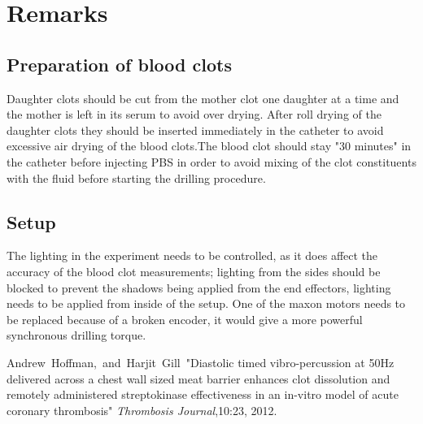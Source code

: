 \documentclass{MNR}
\begin{document}
\section*{Remarks}
\subsection*{Preparation of blood clots}
Daughter clots should be cut from the mother clot one daughter at a time and the mother is left in its serum to avoid over drying. After roll drying of the daughter clots they should be inserted immediately in the catheter to avoid excessive air drying of the blood clots.The blood clot should stay "30 minutes" in the catheter before injecting PBS in order to avoid mixing of the clot constituents with the fluid before starting the drilling procedure. 



\subsection*{Setup}
The lighting in the experiment needs to be controlled, as it does affect the accuracy of the blood clot measurements; lighting from the sides should be blocked to prevent the shadows being applied from the end effectors, lighting needs to be applied from inside of the setup.
One of the maxon motors needs to be replaced because of a broken encoder, it would give a more powerful synchronous drilling torque.



\begin{thebibliography}{500} %

Andrew~Hoffman,~and~Harjit~Gill~"Diastolic timed vibro-percussion at 50Hz delivered across a chest wall sized meat barrier enhances clot dissolution and remotely administered streptokinase effectiveness in an in-vitro model of acute coronary thrombosis" \emph{Thrombosis Journal},10:23, 2012.



\end{thebibliography}
\end{document}
